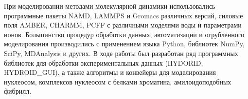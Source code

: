 
При моделировании методами молекулярной динамики использовались программные пакеты NAMD, LAMMPS и Gromacs различных версий, силовые поля AMBER, CHARMM, PCFF  с различными моделями воды и параметрами ионов.
Большинство процедур обработки данных, автоматизации и огрубленного моделирования производились с применением языка Python, библиотек NumPy, SciPy, MDAnalysis и других. В ходе работы был разработан ряд программных библиотек для обработки экспериментальных данных (HYDORID, HYDROID\_GUI), а также алгоритмы и конвейеры для моделирования нуклеосом, комплексов нуклеосом с белками хроматина, амилоидоподобных фибрилл.






